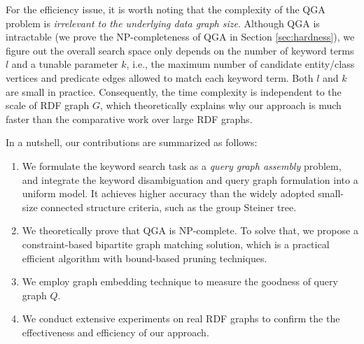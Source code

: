 For the efficiency issue, it is worth noting that the complexity of the QGA problem is \emph{irrelevant to the underlying data graph size}. Although QGA is intractable (we prove the NP-completeness of QGA in Section \ref{sec:hardness}), we figure out the overall search space only depends on the number of keyword terms $l$ and a tunable parameter $k$, i.e., the maximum number of candidate entity/class vertices and predicate edges allowed to match each keyword term. Both $l$ and $k$ are small in practice. Consequently, the time complexity is independent to the scale of RDF graph $G$, which theoretically explains why our approach is much faster than the comparative work over large RDF graphs.

In a nutshell, our contributions are summarized as follows:

\begin{enumerate}
	\item We formulate the keyword search task as a \emph{query graph assembly} problem, and integrate the keyword disambiguation and query graph formulation into a uniform model. It achieves higher accuracy than the widely adopted small-size connected structure criteria, such as the group Steiner tree. 	
	\item We theoretically prove that QGA is NP-complete. To solve that, we propose a constraint-based bipartite graph matching solution, which is a practical efficient algorithm with bound-based pruning techniques. 
	\item We employ graph embedding technique to measure the goodness of query graph $Q$.
	\item We conduct extensive experiments on real RDF graphs
	to confirm the the effectiveness and efficiency of our approach.
\end{enumerate}



